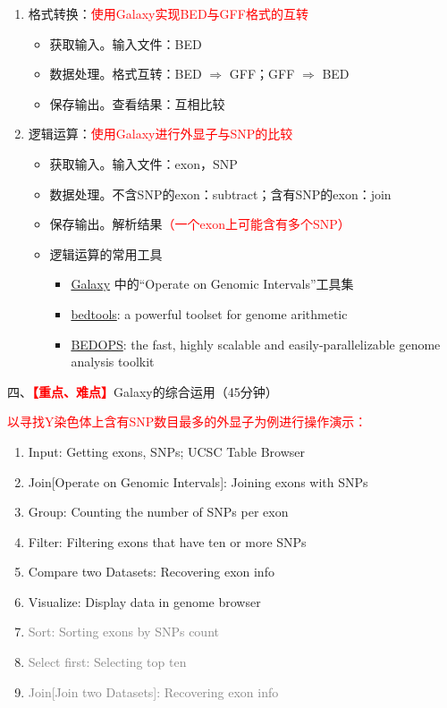 \documentclass{TIJMUjiaoanLL}
\begin{document}
\begin{enumerate}
  \item 格式转换：\textcolor{red}{使用Galaxy实现BED与GFF格式的互转}
    \begin{itemize}
      \item 获取输入。输入文件：BED
      \item 数据处理。格式互转：BED $\Rightarrow$ GFF；GFF $\Rightarrow$ BED
      \item 保存输出。查看结果：互相比较
    \end{itemize}
  \item 逻辑运算：\textcolor{red}{使用Galaxy进行外显子与SNP的比较}
    \begin{itemize}
      \item 获取输入。输入文件：exon，SNP
      \item 数据处理。不含SNP的exon：subtract；含有SNP的exon：join
      \item 保存输出。解析结果\textcolor{red}{（一个exon上可能含有多个SNP）}
      \item 逻辑运算的常用工具
        \begin{itemize}
          \item \href{https://usegalaxy.org/}{Galaxy} 中的“Operate on Genomic Intervals”工具集
          \item \href{http://bedtools.readthedocs.org/en/latest/}{bedtools}: a powerful toolset for genome arithmetic
          \item \href{https://bedops.readthedocs.org/en/latest/}{BEDOPS}: the fast, highly scalable and easily-parallelizable genome analysis toolkit
        \end{itemize}
    \end{itemize}
\end{enumerate}

\vspace*{0.2cm}
\noindent
四、\textcolor{red}{\textbf{【重点、难点】}}Galaxy的综合运用（45分钟）

\textcolor{red}{以寻找Y染色体上含有SNP数目最多的外显子为例进行操作演示：}
\begin{enumerate}
  \item Input: Getting exons, SNPs; UCSC Table Browser
  \item Join[Operate on Genomic Intervals]: Joining exons with SNPs
  \item Group: Counting the number of SNPs per exon
  \item Filter: Filtering exons that have ten or more SNPs
  \item Compare two Datasets: Recovering exon info 
  \item Visualize: Display data in genome browser
  \setcounter{enumi}{3}
\item \textcolor{gray}{Sort: Sorting exons by SNPs count}
  \setcounter{enumi}{3}
\item \textcolor{gray}{Select first: Selecting top ten}
  \setcounter{enumi}{4}
\item \textcolor{gray}{Join[Join two Datasets]: Recovering exon info}
\end{enumerate}
\end{document}
